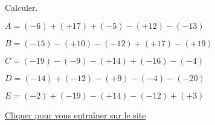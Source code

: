 \begin{exercice*}
    Calculer.
        \begin{list}{}
            \item $ A =  (-6)+(+17)+(-5)-(+12)-(-13) $
            \item $ B =  (-15)-(+10)-(-12)+(+17)-(+19) $
            \item $ C =  (-19)-(-9)-(+14)+(-16)-(-4) $
            \item $ D =  (-14)+(-12)-(+9)-(-4)-(-20) $
            \item $ E =  (-2)+(-19)-(+14)-(-12)+(+3) $
        \end{list}

    \href{https://coopmaths.fr/mathalea.html?ex=5R22,s=20,s2=false,n=5,i=1&v=l}{Cliquer pour vous entraîner sur le site \mathaleaLogo} 
\end{exercice*}
